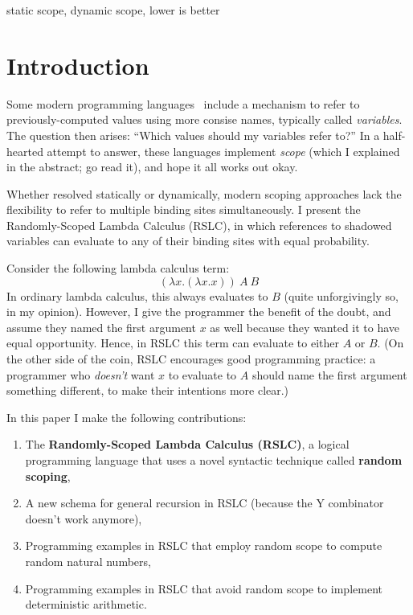 \documentclass[10pt]{sigplanconf}
\begin{document}

\keywords
static scope, dynamic scope, lower is better

\section{Introduction}

Some modern programming languages~\cite{wikiplia,python,lambda,sml,GoLang,RustLang,mla,haskell98,patenttroll} include a mechanism to refer to previously-computed values using more consise names, typically called {\em variables}. The question then arises: ``Which values should my variables refer to?''
In a half-hearted attempt to answer, these languages implement {\em scope} (which I explained in the abstract; go read it), and hope it all works out okay.

Whether resolved statically or dynamically, modern scoping approaches lack the flexibility to refer to multiple binding sites simultaneously.
I present the Randomly-Scoped Lambda Calculus (RSLC), in which references to shadowed variables can evaluate to any of their binding sites with equal probability.

Consider the following lambda calculus term:
\[ (\lambda x. (\lambda x. x))~A~B \]
In ordinary lambda calculus, this always evaluates to $B$ (quite unforgivingly so, in my opinion).
However, I give the programmer the benefit of the doubt, and assume they named the first argument $x$ as well because they wanted it to have equal opportunity. Hence, in RSLC this term can evaluate to either $A$ or $B$.
(On the other side of the coin, RSLC encourages good programming practice: a programmer who {\em doesn't} want $x$ to evaluate to $A$ should name the first argument something different, to make their intentions more clear.)

In this paper I make the following contributions:
\begin{enumerate}
	\item The {\bf Randomly-Scoped Lambda Calculus (RSLC)}, a logical programming language that uses a novel syntactic technique called {\bf random scoping},
	\item A new schema for general recursion in RSLC (because the Y combinator doesn't work anymore),
	\item Programming examples in RSLC that employ random scope to compute random natural numbers,
	\item Programming examples in RSLC that avoid random scope to implement deterministic arithmetic.
\end{enumerate}
\end{document}
